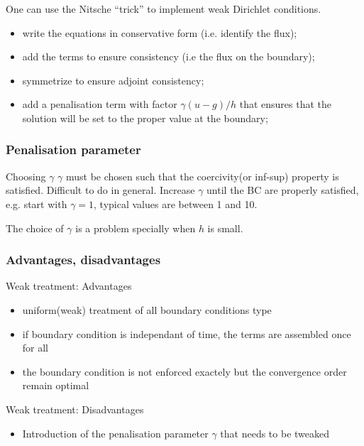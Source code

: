   One can use the Nitsche ``trick'' to implement weak Dirichlet conditions.
  \begin{itemize}
  \item write the equations in conservative form (i.e. identify the flux);
  \item add the terms to ensure consistency (i.e the flux on the boundary);
  \item symmetrize to ensure adjoint consistency;
  \item add a penalisation term with factor $\gamma (u-g)/h$ that ensures
    that the solution will be set to the proper value at the boundary;
  \end{itemize}


\subsubsection{Penalisation parameter}
    \begin{remark}{Choosing $\gamma$}
    $\gamma$ must be chosen such that the coercivity(or inf-sup)
    property is satisfied. Difficult to do in general. Increase
    $\gamma$ until the BC are properly satisfied, e.g. start with
    $\gamma=1$, typical values are between 1 and 10.

    The choice of $\gamma$ is a problem specially when $h$ is small.
  \end{remark}



\subsubsection{Advantages, disadvantages}
      \begin{remark}{Weak treatment: Advantages}
        \begin{itemize}
        \item uniform(weak) treatment of all boundary conditions type
        \item if boundary condition is independant of time, the terms
          are assembled once for all
        \item the boundary condition is not enforced exactely but the
          convergence order remain optimal
        \end{itemize}
      \end{remark}
      \begin{remark}{Weak treatment: Disadvantages}
        \begin{itemize}
        \item Introduction of the penalisation parameter $\gamma$ that
          needs to be tweaked
        \end{itemize}
      \end{remark}

